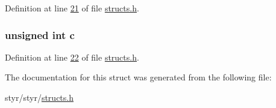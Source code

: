 Definition at line \hyperlink{structs_8h_source_l00021}{21} of file \hyperlink{structs_8h_source}{structs.\+h}.

\subsubsection[{\texorpdfstring{c}{c}}]{\setlength{\rightskip}{0pt plus 5cm}unsigned int c}\hypertarget{structtriple__uint_a6ce17b018c47d0f1d0e53a458f741ad3}{}\label{structtriple__uint_a6ce17b018c47d0f1d0e53a458f741ad3}


Definition at line \hyperlink{structs_8h_source_l00022}{22} of file \hyperlink{structs_8h_source}{structs.\+h}.



The documentation for this struct was generated from the following file\+:\begin{DoxyCompactItemize}
\item 
styr/styr/\hyperlink{structs_8h}{structs.\+h}\end{DoxyCompactItemize}
